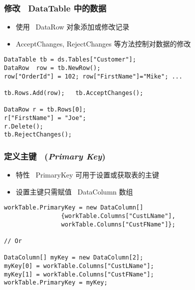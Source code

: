 \begin{frame}[fragile]
\frametitle{修改 ~DataTable 中的数据}
\begin{itemize}
\item 使用 ~DataRow 对象添加或修改记录
\item AcceptChanges, RejectChanges 等方法控制对数据的修改
\end{itemize}
\begin{lstlisting}
DataTable tb = ds.Tables["Customer"];
DataRow  row = tb.NewRow();
row["OrderId"] = 102; row["FirstName"]="Mike"; ...

tb.Rows.Add(row);   tb.AcceptChanges();

DataRow r = tb.Rows[0];
r["FirstName"] = "Joe";
r.Delete();
tb.RejectChanges();
\end{lstlisting}
\end{frame}

\begin{frame}[fragile]
\frametitle{定义主键 ~(\textit{Primary Key})}
\begin{itemize}
\item 特性 ~PrimaryKey 可用于设置或获取表的主键
\item 设置主键只需赋值 ~DataColumn 数组
\end{itemize}
\begin{lstlisting}
workTable.PrimaryKey = new DataColumn[] 
                {workTable.Columns["CustLName"],
                workTable.Columns["CustFName"]};

// Or 

DataColumn[] myKey = new DataColumn[2]; 
myKey[0] = workTable.Columns["CustLName"]; 
myKey[1] = workTable.Columns["CustFName"];
workTable.PrimaryKey = myKey; 

\end{lstlisting}
\end{frame}

